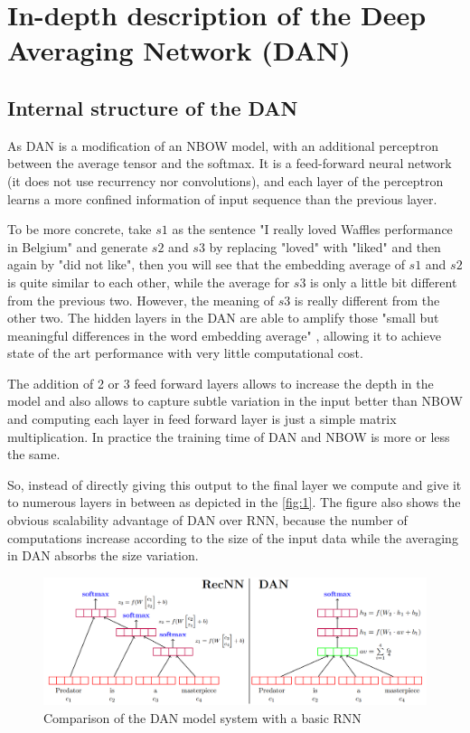 \chapter{In-depth description of the Deep Averaging Network (DAN)}

\section{Internal structure of the DAN}
As DAN is a modification of an NBOW model, with an additional perceptron between the average tensor and the softmax. It is a feed-forward neural network (it does not use recurrency nor convolutions), and each layer of the perceptron learns a more confined information of input sequence than the previous layer.

To be more concrete, take $s1$ as the sentence "I really loved Waffles performance in Belgium" and generate $s2$ and $s3$ by replacing "loved" with "liked" and then again by "did not like", then you will see that the embedding average of $s1$ and $s2$ is quite similar to each other, while the average for $s3$ is only a little bit different from the previous two. However, the meaning of $s3$ is really different from the other two.
The  hidden layers in the DAN are able to amplify those "small but meaningful differences in the word embedding average" \cite{dan_1}, allowing it to achieve state of the art performance with very little computational cost.

The addition of 2 or 3 feed forward layers allows to increase the depth in the model and also allows to capture subtle variation in the input better than NBOW and computing each layer in feed forward layer is just a simple matrix multiplication. In practice the training time of DAN and NBOW is more or less the same.

So, instead of directly giving this output to the final layer we compute and give it to numerous layers in between as depicted in the \autoref{fig:1}. The figure also shows the obvious scalability advantage of DAN over RNN, because the number of computations increase according to the size of the input data while the averaging in DAN absorbs the size variation.

\begin{figure}[!h]
	\begin{center}
		\includegraphics[width=15cm]{img/rnn_dan}
	\end{center}
	\caption{Comparison of the DAN model system with a basic RNN \cite{dan_1}\label{fig:1}}
\end{figure} 

